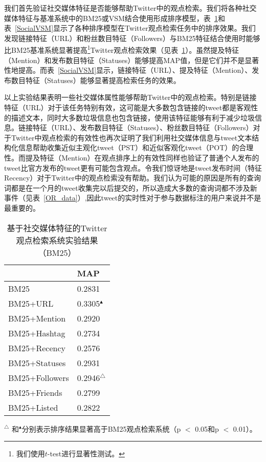 我们首先验证社交媒体特征是否能够帮助Twitter中的观点检索。我们将各种社交媒体特征与基准系统中的BM25或VSM结合使用形成排序模型，表~\ref{SocialBM25}和表~\ref{SocialVSM}显示了各种排序模型在Twitter观点检索任务中的排序效果。我们发现链接特征（URL）和粉丝数目特征（Followers）与BM25特征结合使用时能够比BM25基准系统显著提高\footnote{我们使用$t$-test进行显著性测试。}Twitter观点检索效果（见表~\ref{SocialBM25}）。虽然提及特征（Mention）和发布数目特征（Statuses）能够提高MAP值，但是它们并不是显著性地提高。而表~\ref{SocialVSM}显示，链接特征（URL）、提及特征（Mention）、发布数目特征（Statuses）能够显著提高检索任务的效果。

以上实验结果表明一些社交媒体属性能够帮助Twitter中的观点检索。特别是链接特征（URL）对于该任务特别有效，这可能是大多数包含链接的tweet都是客观性的描述文本，同时大多数垃圾信息也包含链接，使用该特征能够有利于减少垃圾信息。链接特征（URL）、发布数目特征（Statuses）、粉丝数目特征（Followers）对于Twitter中观点检索的有效性也再次证明了我们利用社交媒体信息与tweet文本结构化信息帮助收集近似主观化tweet（PST）和近似客观化tweet（POT）的合理性。而提及特征（Mention）在观点排序上的有效性同样也验证了普通个人发布的tweet比官方发布的tweet更有可能包含观点。令我们惊讶地是tweet发布时间（特征Recency）对于Twitter中的观点检索没有帮助。我们认为可能的原因是所有的查询词都是在一个月的tweet收集完以后提交的，所以造成大多数的查询词都不涉及新事件（见表~\ref{OR_data}）,因此tweet的实时性对于参与数据标注的用户来说并不是最重要的。

\begin{table}
 \centering
  \caption{基于社交媒体特征的Twitter 观点检索系统实验结果（BM25）}
 \label{SocialBM25}
 \begin{tabular}{|l l|}
 \hline
 & MAP \\
 \hline
BM25 &0.2831\\
 \hline
BM25+URL&0.3305$^\blacktriangle$\\
BM25+Mention&0.2920\\
BM25+Hashtag&0.2734\\
BM25+Recency&0.2576 \\
 \hline
BM25+Statuses&0.2931\\
BM25+Followers&0.2946$^\triangle$\\
BM25+Friends&0.2799\\
BM25+Listed&0.2822\\
 \hline
 \end{tabular}
   \begin{tablenotes}
        \footnotesize
\item $^\triangle$ 和$^\blacktriangle$分别表示排序结果显著高于BM25观点检索系统（p $<$ 0.05和p $<$ 0.01）。
\end{tablenotes}
\end{table}

